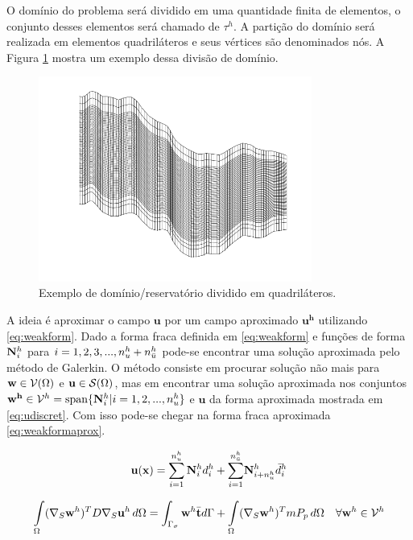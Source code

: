 O domínio do problema será dividido em uma quantidade finita de elementos, o conjunto desses elementos será chamado de $\tau^h$.  A partição do domínio será realizada em elementos quadriláteros e seus vértices são denominados nós. A Figura \ref{fig:elemento} mostra um exemplo dessa divisão de domínio.

\begin{figure}[!htbp]
\centering
\includegraphics[width=0.8\textwidth]{chap01/figs/exemplo_dominio.png}
\caption{Exemplo de domínio/reservatório dividido em quadriláteros.}
\label{fig:elemento}
\end{figure}


A ideia é aproximar o campo $\mathbf{u}$ por um campo aproximado $\mathbf{u^h}$ utilizando \eqref{eq:weakform}. Dado a forma fraca definida em \eqref{eq:weakform} e funções de forma ${\mathbf{N}_{i}^h}$ para $i = 1, 2, 3, ..., n_u^h + n_{\bar{u}}^h$ pode-se encontrar uma solução aproximada pelo método de Galerkin. O método consiste em procurar solução não mais para $\mathbf{w} \in \mathcal{V}(\Omega)$ e $\mathbf{u} \in \mathcal{S}(\Omega)$, mas em encontrar uma solução aproximada nos conjuntos  $\mathbf{w^h} \in \mathcal{V}^h = \text{span}\{ {\mathbf{N}_{i}^h} | i = 1,2, ..., n_u^h  \}$ e $\mathbf{u}$ da forma aproximada mostrada em \eqref{eq:udiscret}. Com isso pode-se chegar na forma fraca aproximada \eqref{eq:weakformaprox}.


\begin{equation}\label{eq:udiscret}
\mathbf{u}(\mathbf{x}) = \sum_{i=1}^{n_u^h} {\mathbf{N}_{i}^h}  d_i^h + {\sum_{i=1}^ {n^h_{\bar{u}}}}  \mathbf{N}_{i+n_u^h}^h \bar{d}_i^h 
\end{equation}


\begin{equation}\label{eq:weakformaprox}
\int\limits_{\Omega}  (\nabla_S \mathbf{w}^h)^T D \nabla_S  \mathbf{u}^h \, d\Omega  =  \int_{\Gamma_\sigma} \mathbf{w}^h \bar{\mathbf{t}} d\Gamma  +  \int\limits_{\Omega} (\nabla_S\mathbf{w}^h)^T m P_p \, d\Omega  \quad \forall \mathbf{w}^h \in \mathcal{V}^h
\end{equation}

